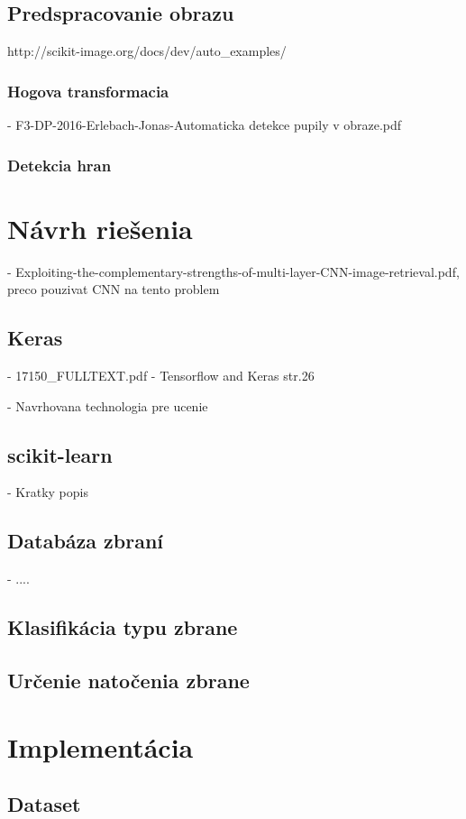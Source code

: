 \section{Predspracovanie obrazu}
http://scikit-image.org/docs/dev/auto\_examples/

\subsection{Hogova transformacia}
- F3-DP-2016-Erlebach-Jonas-Automaticka detekce pupily v obraze.pdf

\subsection{Detekcia hran}


\chapter{Návrh riešenia}

- Exploiting-the-complementary-strengths-of-multi-layer-CNN-image-retrieval.pdf,
preco pouzivat CNN na tento problem

\section{Keras}
- 17150\_FULLTEXT.pdf - Tensorflow and Keras str.26

- Navrhovana technologia pre ucenie

\section{scikit-learn}
- Kratky popis

\section{Databáza zbraní}
- ....

\section{Klasifikácia typu zbrane}

\section{Určenie natočenia zbrane}


\pagebreak
\chapter{Implementácia}

\section{Dataset}
